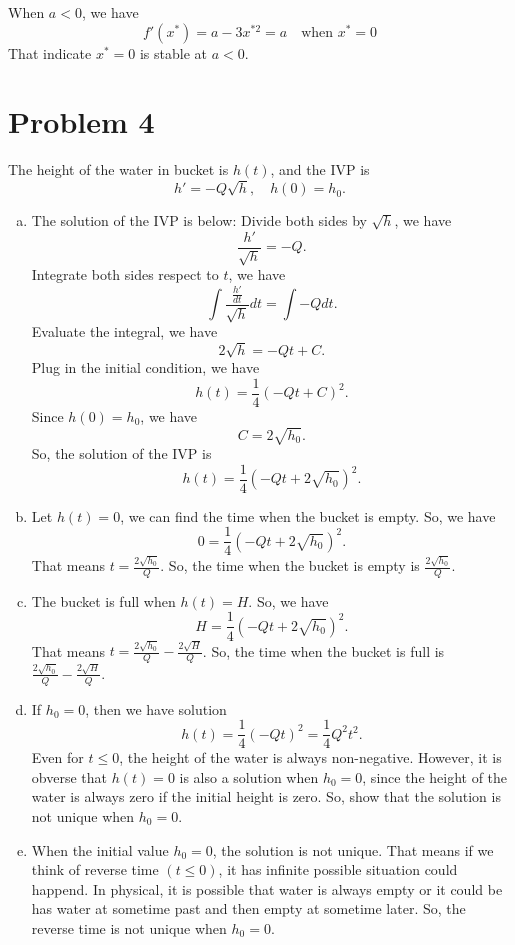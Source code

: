 \documentclass[12pt]{exam}
\begin{document}
When $a < 0$, we have
\[ f'(x^*) = a - 3x^{*2} = a \quad \text{when } x^*=0\]
That indicate $x^* = 0$ is stable at $a < 0$.


\section*{Problem 4}
The height of the water in bucket is $h(t)$, and the IVP is 
\[h' = -Q \sqrt{h}, \quad h(0) = h_0.\]

\begin{enumerate}[(a)]
	\item The solution of the IVP is below:
	Divide both sides by $\sqrt{h}$, we have
	\[\frac{h'}{\sqrt{h}} = -Q.\]
	Integrate both sides respect to $t$, we have
	\[\int \frac{\frac{h'}{dt}}{\sqrt{h}} dt = \int -Q dt.\]
	Evaluate the integral, we have
	\[2\sqrt{h} = -Qt + C.\]
	Plug in the initial condition, we have
	\[h(t) = \frac{1}{4}(-Qt + C)^2.\]
	Since $h(0)=h_0$, we have
	\[C = 2\sqrt{h_0}.\]
	So, the solution of the IVP is
	\[h(t) = \frac{1}{4}(-Qt + 2\sqrt{h_0})^2.\]

	\item Let $h(t) = 0$, we can find the time when the bucket is empty. So, we have
	\[0 = \frac{1}{4}(-Qt + 2\sqrt{h_0})^2.\]
	That means $t = \frac{2\sqrt{h_0}}{Q}$. So, the time when the bucket is empty is $\frac{2\sqrt{h_0}}{Q}$.

	\item The bucket is full when $h(t) = H$. So, we have
	\[H = \frac{1}{4}(-Qt + 2\sqrt{h_0})^2.\]
	That means $t = \frac{2\sqrt{h_0}}{Q} - \frac{2\sqrt{H}}{Q}$. So, the time when the bucket is full is $\frac{2\sqrt{h_0}}{Q} - \frac{2\sqrt{H}}{Q}$.

	\item If $h_0=0$, then we have solution
		\[h(t) = \frac{1}{4}(-Qt)^2 = \frac{1}{4}Q^2t^2.\]
		Even for $t \leq 0$, the height of the water is always non-negative.
	However, it is obverse that $h(t)=0$ is also a solution when $h_0=0$, since the height of the water is always zero if the initial height is zero. So, show that the solution is not unique when $h_0=0$.

	\item When the initial value $h_0=0$, the solution is not unique. That means if we think of reverse time $(t \leq 0)$, it has infinite possible situation could happend. In physical, it is possible that water is always empty or it could be has water at sometime past and then empty at sometime later. So, the reverse time is not unique when $h_0=0$.

\end{enumerate}
\end{document}
